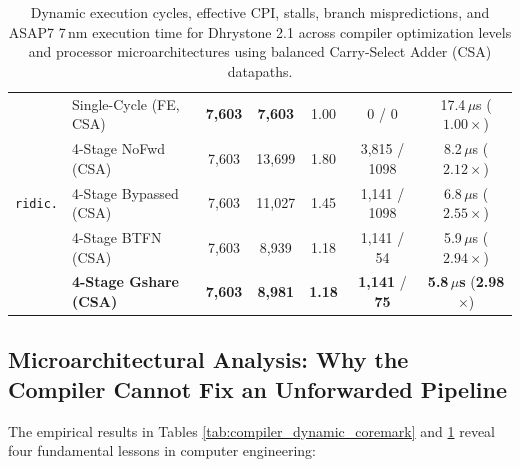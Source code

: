 \begin{table}[htbp]
{\begin{tabular}{|l|l|c|c|c|c|c|}
\hline
\multirow{5}{*}{\texttt{ridic.}} 
 & Single-Cycle (FE, CSA) & \textbf{7,603}     & \textbf{7,603}     & 1.00 & 0 / 0             & 17.4\,$\mu$s ($1.00\times$) \\
 & 4-Stage NoFwd (CSA)    & 7,603     & 13,699    & 1.80 & 3,815 / 1098     & 8.2\,$\mu$s ($2.12\times$) \\
 & 4-Stage Bypassed (CSA) & 7,603     & 11,027    & 1.45 & 1,141 / 1098     & 6.8\,$\mu$s ($2.55\times$) \\
 & 4-Stage BTFN (CSA)     & 7,603     & 8,939     & 1.18 & 1,141 / 54        & 5.9\,$\mu$s ($2.94\times$) \\
 & \textbf{4-Stage Gshare (CSA)} & \textbf{7,603}     & \textbf{8,981}     & \textbf{1.18} & \textbf{1,141} / \textbf{75}  & \textbf{5.8\,$\mu$s} (\textbf{2.98$\times$}) \\
\hline
\end{tabular}%
}
\caption{Dynamic execution cycles, effective CPI, stalls, branch mispredictions, and ASAP7 7\,nm execution time for Dhrystone 2.1 across compiler optimization levels and processor microarchitectures using balanced Carry-Select Adder (CSA) datapaths.}\label{tab:compiler_dynamic_dhrystone}
\end{table}

\subsection{Microarchitectural Analysis: Why the Compiler Cannot Fix an Unforwarded Pipeline}
The empirical results in Tables \ref{tab:compiler_dynamic_coremark} and \ref{tab:compiler_dynamic_dhrystone} reveal four fundamental lessons in computer engineering:

